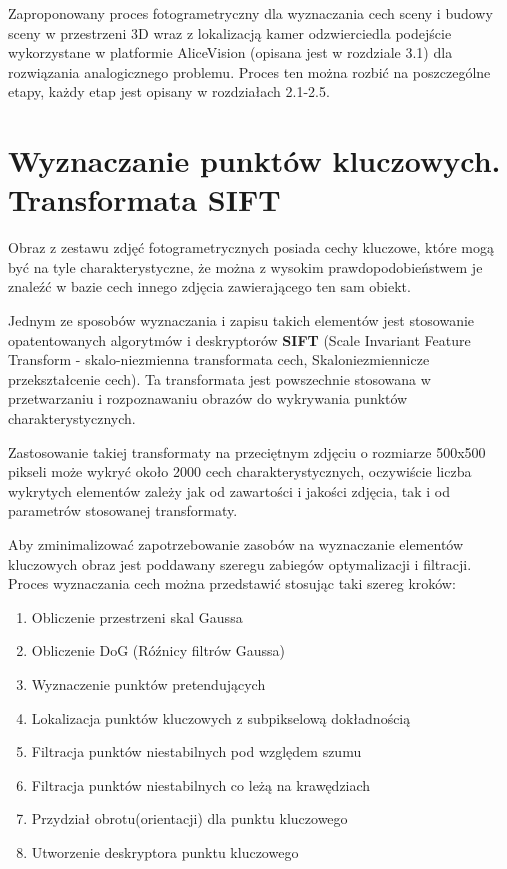 Zaproponowany proces fotogrametryczny dla wyznaczania cech sceny i budowy sceny w przestrzeni 3D wraz z lokalizacją kamer odzwierciedla podejście wykorzystane w platformie AliceVision (opisana jest w rozdziale 3.1) dla rozwiązania analogicznego problemu. Proces ten można rozbić na poszczególne etapy, każdy etap jest opisany w rozdziałach 2.1-2.5.

\section{Wyznaczanie punktów kluczowych. Transformata SIFT}
Obraz z zestawu zdjęć fotogrametrycznych posiada cechy kluczowe, które mogą być na tyle charakterystyczne, że można z wysokim prawdopodobieństwem je znaleźć w bazie cech innego zdjęcia zawierającego ten sam obiekt.

Jednym ze sposobów wyznaczania i zapisu takich elementów jest stosowanie opatentowanych algorytmów i deskryptorów \textbf{SIFT} (Scale Invariant Feature Transform - skalo-niezmienna transformata cech, Skaloniezmiennicze przekształcenie cech). Ta transformata jest powszechnie stosowana w przetwarzaniu i rozpoznawaniu obrazów do wykrywania punktów charakterystycznych.

Zastosowanie takiej transformaty na przeciętnym zdjęciu o rozmiarze 500x500 pikseli może wykryć około 2000 cech charakterystycznych, oczywiście liczba wykrytych elementów zależy jak od zawartości i jakości zdjęcia, tak i od parametrów stosowanej transformaty.

Aby zminimalizować zapotrzebowanie zasobów na wyznaczanie elementów kluczowych obraz jest poddawany szeregu zabiegów optymalizacji i filtracji. Proces wyznaczania cech można przedstawić stosując taki szereg kroków:
\begin{enumerate}
   \item Obliczenie przestrzeni skal Gaussa
   \item Obliczenie DoG (Róźnicy filtrów Gaussa)
   \item Wyznaczenie punktów pretendujących
   \item Lokalizacja punktów kluczowych z subpikselową dokładnością
   \item Filtracja punktów niestabilnych pod względem szumu
   \item Filtracja punktów niestabilnych co leżą na krawędziach
   \item Przydział obrotu(orientacji) dla punktu kluczowego
   \item Utworzenie deskryptora punktu kluczowego
\end{enumerate}

